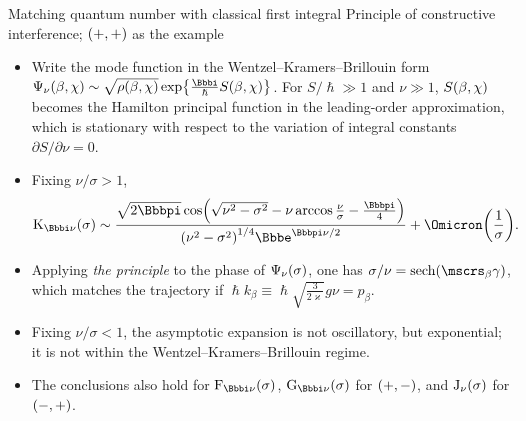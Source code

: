\documentclass[8pt]{beamer}
\begin{document}
\begin{frame}%
{Matching quantum number with classical first integral}%
{Principle of constructive interference; ${\left(+,+\right)}$ as the example}

\begin{itemize}
\item Write the mode function in the Wentzel--Kramers--Brillouin form
$\rfun{\Psi_{\nu}}{\beta,\chi} \sim \sqrt{\rfun{\rho}{\beta,\chi}}\,
\cfun{\exp}{\frac{\ii}{\hslash}\rfun{S}{\beta,\chi}}$.
For $S/\hslash \gg 1$ and $\nu \gg 1$, ${S}\mathopen{}\left(\beta,\chi\right)\mathclose{}$ becomes
the Hamilton principal function in the leading-order approximation, which is
\alert{stationary} with respect to the variation of integral constants
$\partial S/\partial \nu = 0$.
\end{itemize}


\begin{itemize}
\item Fixing $\nu/\sigma>1$,
\begin{align}
\rfun{\mathrm{K}_{\ii \nu}}{\sigma} \sim
\frac{\sqrt{2\pp}\,
\rfun{\cos}{\sqrt{\nu^2-\sigma^2}-\nu\arccos\frac{\nu}{\sigma}-\frac{\pp}{4}}
}{
\rbr{\nu^2-\sigma^2}^{1/4}\ee^{\pp\nu/2}}
+\rfun{\Omicron}{\frac{1}{\sigma}}.
\end{align}

\item Applying \emph{the principle} to the phase of ${\Psi_\nu}\mathopen{}\left(\sigma\right)\mathclose{}$, 
one has
$\sigma/\nu = \rfun{\sech}{\mscrs_\beta\gamma}$, which matches the trajectory
if $\hslash k_\beta \equiv \hslash \sqrt{\frac{3}{2\varkappa}}g\nu
= p_\beta$.


\item Fixing $\nu/\sigma<1$, the asymptotic expansion is not oscillatory,
but exponential; it is not within the Wentzel--Kramers--Brillouin regime.
\end{itemize}

\begin{itemize}
\item The conclusions also hold for $\rfun{\mathrm{F}_{\ii\nu}}{\sigma}$, 
$\rfun{\mathrm{G}_{\ii\nu}}{\sigma}$ for ${\left(+,-\right)}$, and
${\mathrm{J}_{\nu}}\mathopen{}\left(\sigma\right)\mathclose{}$ for ${\left(-,+\right)}$.
\end{itemize}
\end{frame}
\end{document}

